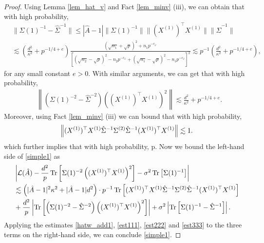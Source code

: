 \begin{proof}
Using Lemma \ref{lem_hat_v} and Fact \ref{lem_minv} (iii), we can obtain that with high probability,
\begin{align}
&\|\Sigma(1)^{-1}-\hat\Sigma^{-1}\| \le |\hat A-1|\|\Sigma(1)^{-1}\| \| (X^{(1)})^\top X^{(1)}\|\|\hat\Sigma^{-1}\| \label{est111}\\
&\lesssim \left(\frac{d^2}{\kappa^2} + p^{-1/4+e}\right)\frac{(\sqrt{n_1}+\sqrt{p})^{2}+n_1p^{-c_\varphi}}{ \left[(\sqrt{n_2}-\sqrt{p})^{2}-n_2p^{-c_\varphi}  + (\sqrt{n_1}-\sqrt{p})^{2}-n_1p^{-c_\varphi}\right]^2  }\lesssim p^{-1}\left(\frac{d^2}{\kappa^2} + p^{-1/4+e}\right),\nonumber
\end{align}
for any small constant $e>0$. With similar arguments, we can get that with high probability,
\begin{align}\label{est222}
&\left\|\left(\Sigma(1)^{-2}-\hat\Sigma^{-2}\right)\left((X^{(1)})^\top X^{(1)} \right)^2\right\| \lesssim  \frac{d^2}{\kappa^2} + p^{-1/4+e} .
\end{align}
Moreover, using Fact \ref{lem_minv} (iii) we can bound that with high probability,
$$\left\|  (X^{(1)})^{\top}X^{(1)} \hat\Sigma^{-1} \Sigma^{(2)} \hat\Sigma^{-1} (X^{(1)})^{\top}X^{(1)} \right\|\lesssim 1.$$
which further implies that with high probability,
\be\label{est333}\lesssim p.\ee
Now we bound the left-hand side of \eqref{simple1} as
\begin{align*}
&\left|\mathcal L(\hat A)-\frac{d^2}{p}\operatorname{Tr}\left[\Sigma(1)^{-2} \left((X^{(1)})^\top X^{(1)} \right)^2\right] -\sigma^2  \operatorname{Tr}\left[\Sigma(1)^{-1}  \right]\right| \\
&\lesssim \left(|\hat A-1|^2 \kappa^2 + |\hat A-1|d^2\right)\cdot p^{-1}\operatorname{Tr}\left[ (X^{(1)})^{\top}X^{(1)} \hat\Sigma^{-1} \Sigma^{(2)} \hat\Sigma^{-1} (X^{(1)})^{\top}X^{(1)} \right] \\
&+ \frac{d^2}{p}\left|\operatorname{Tr}\left[\left(\Sigma(1)^{-2}-\hat\Sigma^{-2}\right) \left((X^{(1)})^\top X^{(1)} \right)^2\right]\right|+ \sigma^2  \left|\operatorname{Tr}\left[\Sigma(1)^{-1}-\hat\Sigma^{-1}  \right]\right|.
\end{align*}
Applying the estimates \eqref{hatw_add1}, \eqref{est111}, \eqref{est222} and \eqref{est333} to the three terms on the right-hand side, we can conclude \eqref{simple1}.

\end{proof}
